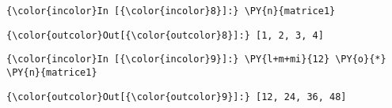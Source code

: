    \begin{Verbatim}[commandchars=\\\{\}]
{\color{incolor}In [{\color{incolor}8}]:} \PY{n}{matrice1}
\end{Verbatim}


\begin{Verbatim}[commandchars=\\\{\}]
{\color{outcolor}Out[{\color{outcolor}8}]:} [1, 2, 3, 4]
\end{Verbatim}
            
    \begin{Verbatim}[commandchars=\\\{\}]
{\color{incolor}In [{\color{incolor}9}]:} \PY{l+m+mi}{12} \PY{o}{*} \PY{n}{matrice1}
\end{Verbatim}


\begin{Verbatim}[commandchars=\\\{\}]
{\color{outcolor}Out[{\color{outcolor}9}]:} [12, 24, 36, 48]
\end{Verbatim}
            

    
    
    
